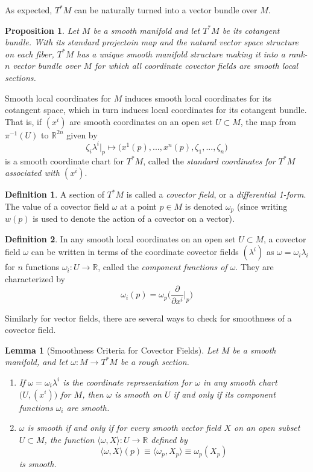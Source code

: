 \documentclass{article}
\newtheorem{proposition}[theorem]{Proposition}
\newtheorem{lemma}[theorem]{Lemma}
\theoremstyle{remark}
\theoremstyle{definition}
\newtheorem{definition}{Definition}[section]
\begin{document}
As expected, $T^* M$ can be naturally turned into a vector bundle over $M$. 

\begin{proposition}
Let $M$ be a smooth manifold and let $T^* M$ be its cotangent bundle. With its standard projectoin map and the natural vector space structure on each fiber, $T^*M$ has a unique smooth manifold structure making it into a rank-$n$ vector bundle over $M$ for which all coordinate covector fields are smooth local sections. 
\end{proposition}

Smooth local coordinates for $M$ induces smooth local coordinates for its cotangent space, which in turn induces local coordinates for its cotangent bundle. That is, if $(x^i)$ are smooth coordinates on an open set $U \subset M$, the map from $\pi^{-1} (U)$ to $\mathbb{R}^{2n}$ given by 
\[\zeta_i \lambda^i \big|_p \mapsto \big( x^1 (p), ..., x^n(p), \zeta_1, ..., \zeta_n \big) \]
is a smooth coordinate chart for $T^* M$, called the \textit{standard coordinates for $T^* M$ associated with $(x^i)$}. 

\begin{definition}
A section of $T^* M$ is called a \textit{covector field}, or a \textit{differential 1-form}. The value of a covector field $\omega$ at a point $p \in M$ is denoted $\omega_p$ (since writing $w(p)$ is used to denote the action of a covector on a vector). 
\end{definition}

\begin{definition}
In any smooth local coordinates on an open set $U \subset M$, a covector field $\omega$ can be written in terms of the coordinate covector fields $(\lambda^i)$ as $\omega = \omega_i \lambda_i$ for $n$ functions $\omega_i: U \longrightarrow \mathbb{R}$, called the \textit{component functions of $\omega$}. They are characterized by 
\[\omega_i (p) = \omega_p \bigg( \frac{\partial}{\partial x^i} \bigg|_p \bigg)\]
\end{definition}

Similarly for vector fields, there are several ways to check for smoothness of a covector field. 

\begin{lemma}[Smoothness Criteria for Covector Fields]
Let $M$ be a smooth manifold, and let $\omega: M \longrightarrow T^* M$ be a rough section. 
\begin{enumerate}
    \item If $\omega = \omega_i \lambda^i$ is the coordinate representation for $\omega$ in any smooth chart $\big(U, (x^i)\big)$ for $M$, then $\omega$ is smooth on $U$ if and only if its component functions $\omega_i$ are smooth. 
    \item $\omega$ is smooth if and only if for every smooth vector field $X$ on an open subset $U \subset M$, the function $\langle \omega, X \rangle: U \longrightarrow \mathbb{R}$ defined by 
    \[\langle \omega, X \rangle (p) \equiv \langle \omega_p, X_p \rangle \equiv \omega_p (X_p)\]
    is smooth. 
\end{enumerate}
\end{lemma}
\end{document}

